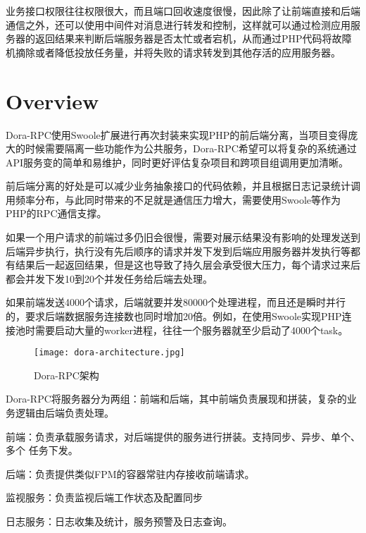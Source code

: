 业务接口权限往往权限很大，而且端口回收速度很慢，因此除了让前端直接和后端通信之外，还可以使用中间件对消息进行转发和控制，这样就可以通过检测应用服务器的返回结果来判断后端服务器是否太忙或者宕机，从而通过PHP代码将故障机摘除或者降低投放任务量，并将失败的请求转发到其他存活的应用服务器。


\section{Overview}

Dora-RPC使用Swoole扩展进行再次封装来实现PHP的前后端分离，当项目变得庞大的时候需要隔离一些功能作为公共服务，Dora-RPC希望可以将复杂的系统通过API服务变的简单和易维护，同时更好评估复杂项目和跨项目组调用更加清晰。

前后端分离的好处是可以减少业务抽象接口的代码依赖，并且根据日志记录统计调用频率分布，与此同时带来的不足就是通信压力增大，需要使用Swoole等作为PHP的RPC通信支撑。

如果一个用户请求的前端过多仍旧会很慢，需要对展示结果没有影响的处理发送到后端异步执行，执行没有先后顺序的请求并发下发到后端应用服务器并发执行等都有结果后一起返回结果，但是这也导致了持久层会承受很大压力，每个请求过来后都会并发下发10到20个并发任务给后端去处理。

如果前端发送4000个请求，后端就要并发80000个处理进程，而且还是瞬时并行的，要求后端数据服务连接数也同时增加20倍。例如，在使用Swoole实现PHP连接池时需要启动大量的worker进程，往往一个服务器就至少启动了4000个task。









\begin{figure}[htbp]
\centering
\texttt{[image: dora-architecture.jpg]}
\caption{Dora-RPC架构}
\end{figure}

Dora-RPC将服务器分为两组：前端和后端，其中前端负责展现和拼装，复杂的业务逻辑由后端负责处理。

\begin{compactitem}
\item 前端：负责承载服务请求，对后端提供的服务进行拼装。支持同步、异步、单个、多个 任务下发。
\item 后端：负责提供类似FPM的容器常驻内存接收前端请求。
\item 监视服务：负责监视后端工作状态及配置同步
\item 日志服务：日志收集及统计，服务预警及日志查询。
\end{compactitem}

